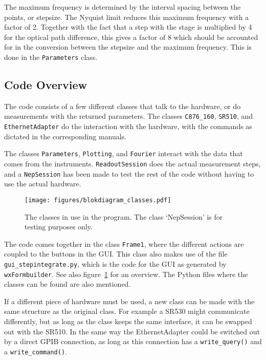 The maximum frequency is determined by the interval spacing between the points, or stepsize. The Nyquist limit reduces this maximum frequency with a factor of 2. Together with the fact that a step with the stage is multiplied by 4 for the optical path difference, this gives a factor of 8 which should be accounted for in the conversion between the stepsize and the maximum frequency. This is done in the \verb!Parameters! class.

\subsection{Code Overview}\label{sub:codeoverview}

The code consists of a few different classes that talk to the hardware, or do measurements with the returned parameters. The classes \verb!C876_160!, \verb!SR510!, and \verb!EthernetAdapter! do the interaction with the hardware, with the commands as dictated in the corresponding manuals.

The classes \verb!Parameters!, \verb!Plotting!, and \verb!Fourier! interact with the data that comes from the instruments. \verb!ReadoutSession! does the actual measurement steps, and a \verb!NepSession! has been made to test the rest of the code without having to use the actual hardware.

\begin{figure}[h!tb]
 \begin{center}
  \texttt{[image: figures/blokdiagram\_classes.pdf]}
  \caption{The classes in use in the program. The class `NepSession' is for testing purposes only.}
  \label{fig:blokdiagram}
 \end{center}
\end{figure}

The code comes together in the class \verb!Frame1!, where the different actions are coupled to the buttons in the GUI. This class also makes use of the file \verb!gui_stepintegrate.py!, which is the code for the GUI as generated by \verb!wxFormbuilder!. See also figure~\ref{fig:blokdiagram} for an overview. The Python files where the classes can be found are also mentioned.

If a different piece of hardware must be used, a new class can be made with the same structure as the original class. For example a SR530 might communicate differently, but as long as the class keeps the same interface, it can be swapped out with the SR510. In the same way the EthernetAdapter could be switched out by a direct GPIB connection, as long as this connection has a \verb!write_query()! and a \verb!write_command()!.

